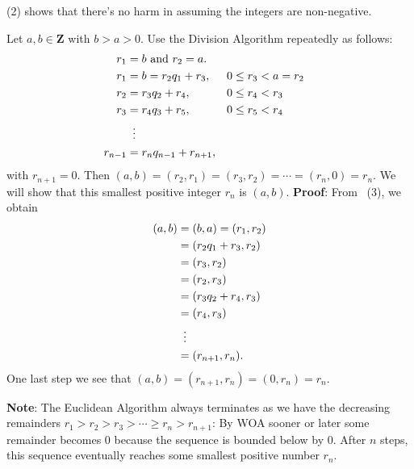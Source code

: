  (2) shows that there's no harm in assuming
the integers are non-negative.
\begin{Theorem}{}{}
    Let $ a,b\in\mathbf{Z} $ with $ b>a>0 $. Use the Division Algorithm repeatedly as follows:
    \begin{align*}
        r_1     & =b\text{ and }r_2=a.                      \\
        r_1     & =b=r_2q_1+r_3,        &  & 0\le r_3<a=r_2 \\
        r_2     & =r_3q_2+r_4,          &  & 0\le r_4<r_3   \\
        r_3     & =r_4q_3+r_5,          &  & 0\le r_5<r_4   \\
                & \vdotswithin{=}                           \\
        r_{n-1} & =r_n q_{n-1}+r_{n+1},
    \end{align*}
    with $ r_{n+1}=0 $. Then $ (a,b)=(r_2,r_1)=(r_3,r_2)=\cdots=(r_n,0)=r_n $. We will show that this smallest
    positive integer $ r_n $ is $ (a,b) $.
    \tcblower{}
    \textbf{Proof}: From~ (3), we obtain
    \begin{align*}
        (a,b) & =(b,a)=(r_1,r_2)  \\
              & =(r_2q_1+r_3,r_2) \\
              & =(r_3,r_2)        \\
              & =(r_2,r_3)        \\
              & =(r_3q_2+r_4,r_3) \\
              & =(r_4,r_3)        \\
              & \vdotswithin{=}   \\
              & =(r_{n+1},r_n).
    \end{align*}
    One last step we see that $ (a,b)=(r_{n+1},r_n)=(0,r_n)=r_n $.
\end{Theorem}
\textbf{Note}: The Euclidean Algorithm always terminates as we have the decreasing
remainders $ r_1>r_2>r_3>\cdots\ge r_{n}>r_{n+1} $: By WOA sooner or later some remainder
becomes $0$ because the sequence is bounded below by $0$. After $n$ steps, this
sequence eventually reaches some smallest positive number $ r_n $.
